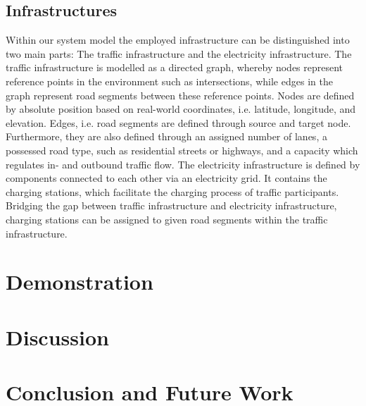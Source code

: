 \documentclass[conference]{IEEEtran}
\begin{document}
\subsection{Infrastructures}
Within our system model the employed infrastructure can be distinguished into two main parts: The traffic infrastructure and the electricity infrastructure.
The traffic infrastructure is modelled as a directed graph, whereby nodes represent reference points in the environment such as intersections, while edges in the graph represent road segments between these reference points. Nodes are defined by absolute position based on real-world coordinates, i.e. latitude, longitude, and elevation. Edges, i.e. road segments are defined through source and target node. Furthermore, they are also defined through an assigned number of lanes, a possessed road type, such as residential streets or highways, and a capacity which regulates in- and outbound traffic flow.
The electricity infrastructure is defined by components connected to each other via an electricity grid. It contains the charging stations, which facilitate the charging process of traffic participants. Bridging the gap between traffic infrastructure and electricity infrastructure, charging stations can be assigned to given road segments within the traffic infrastructure.

\section{Demonstration}

\section{Discussion}

\section{Conclusion and Future Work}



\end{document}
